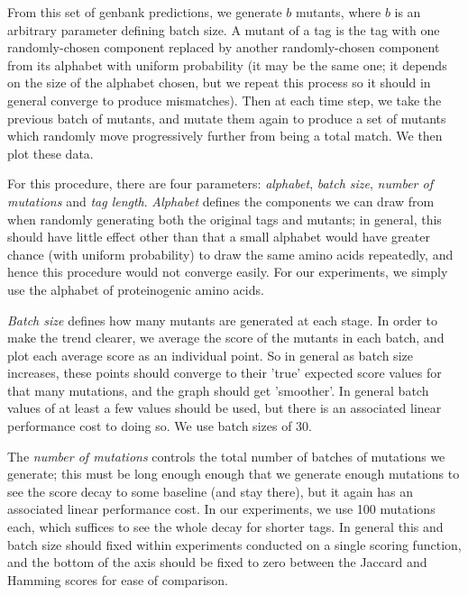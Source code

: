 \documentclass{l4proj}
\begin{document}
From this set of genbank predictions, we generate \(b\) mutants, where \(b\) is an arbitrary parameter defining batch size.  A mutant of a tag is the tag with one randomly-chosen component replaced by another randomly-chosen component from its alphabet with uniform probability (it may be the same one; it depends on the size of the alphabet chosen, but we repeat this process so it should in general converge to produce mismatches). Then at each time step, we take the previous batch of mutants, and mutate them again to produce a set of mutants which randomly move progressively further from being a total match. We then plot these data. 

For this procedure, there are four parameters: \textit{alphabet}, \textit{batch size}, \textit{number of mutations} and \textit{tag length}. \textit{Alphabet} defines the components we can draw from when randomly generating both the original tags and mutants; in general, this should have little effect other than that a small alphabet would have greater chance (with uniform probability) to draw the same amino acids repeatedly, and hence this procedure would not converge easily. For our experiments, we simply use the alphabet of proteinogenic amino acids.

\textit{Batch size} defines how many mutants are generated at each stage. In order to make the trend clearer, we average the score of the mutants in each batch, and plot each average score as an individual point. So in general as batch size increases, these points should converge to their 'true' expected score values for that many mutations, and the graph should get 'smoother'. In general batch values of at least a few values should be used, but there is an associated linear performance cost to doing so. We use batch sizes of 30.

The \textit{number of mutations} controls the total number of batches of mutations we generate; this must be long enough enough that we generate enough mutations to see the score decay to some baseline (and stay there), but it again has an associated linear performance cost. In our experiments, we use 100 mutations each, which suffices to see the whole decay for shorter tags. In general this and batch size should fixed within experiments conducted on a single scoring function, and the bottom of the axis should be fixed to zero between the Jaccard and Hamming scores for ease of comparison.
\end{document}
